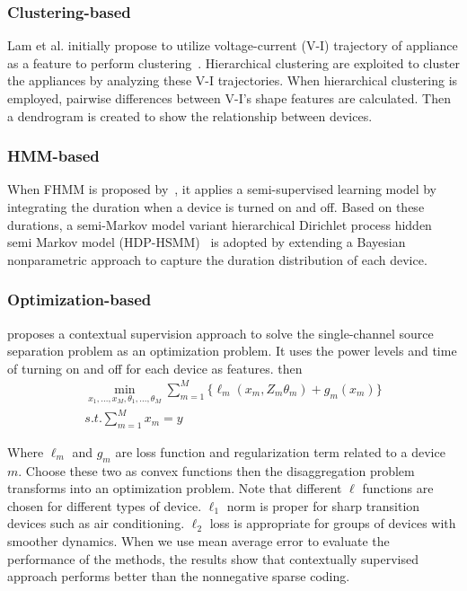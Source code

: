 \subsubsection{Clustering-based} 
Lam et al. initially propose to utilize voltage-current (V-I) trajectory of appliance as 
a feature to perform clustering~\cite{lam2007novel}.  
Hierarchical clustering are exploited to cluster the appliances by
analyzing these V-I trajectories.
When hierarchical clustering is employed,
pairwise differences between V-I's shape features
are calculated.
Then a dendrogram is created to show the
relationship between devices. %


\subsubsection{HMM-based}
When FHMM is proposed by~\cite{kim2011unsupervised}, 
it applies a semi-supervised learning model by integrating 
the duration when a device is turned on and off. 
Based on these durations, a semi-Markov model variant hierarchical Dirichlet 
process hidden semi Markov model (HDP-HSMM)~\cite{johnson2012bayesian} 
is adopted by extending a Bayesian nonparametric approach to capture the 
duration distribution of each device. 
 
\subsubsection{Optimization-based}
\cite{wytock2014contextually} proposes a contextual supervision approach to 
solve the single-channel source separation problem as an optimization problem. 
It uses the power levels and time of turning on and off for each device as features. 
then
\begin{equation}
\begin{aligned}
\min_{x_1,...,x_M, \theta_1, ..., \theta_M} \sum_{m=1}^{M} \{ \ell_m(x_m, Z_m\theta_m)+g_m(x_m) \} \\
s.t. \sum_{m=1}^{M}x_m=y
\end{aligned}
\end{equation}

Where $\ell_m$ and $g_m$ are loss function and regularization term related to a device $m$. 
Choose these two as convex functions then the disaggregation problem 
transforms into an optimization problem. 
Note that different $\ell$ functions are chosen for different types of device. 
$\ell_1$ norm is proper for sharp transition devices such as air conditioning. 
$\ell_2$ loss is appropriate for groups of devices with smoother dynamics. 
When we use mean average error to evaluate the performance of the methods, the results show 
that contextually supervised approach performs better than the nonnegative sparse coding. 

